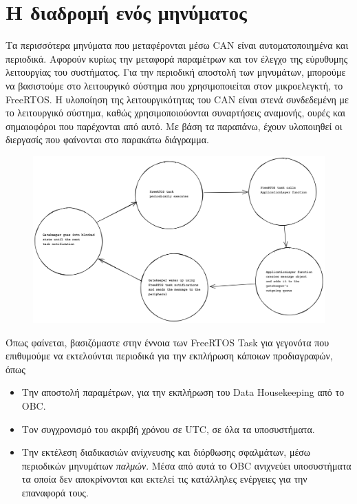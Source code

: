 \documentclass[a4paper,nobib,justified]{tufte-book}
\begin{document}

\section{Η διαδρομή ενός μηνύματος}

Τα περισσότερα μηνύματα που μεταφέρονται μέσω CAN είναι αυτοματοποιημένα και περιοδικά. Αφορούν κυρίως την μεταφορά παραμέτρων και τον έλεγχο της εύρυθυμης λειτουργίας του συστήματος. Για την περιοδική αποστολή των μηνυμάτων, μπορούμε να βασιστούμε στο λειτουργικό σύστημα που χρησιμοποιείται στον μικροελεγκτή, το FreeRTOS. Η υλοποίηση της λειτουργικότητας του CAN είναι στενά συνδεδεμένη με το λειτουργικό σύστημα, καθώς χρησιμοποιούονται συναρτήσεις αναμονής, ουρές και σημαιοφόροι που παρέχονται από αυτό. Με βάση τα παραπάνω, έχουν υλοποιηθεί οι διεργασίς που φαίνονται στο παρακάτω διάγραμμα.

\begin{figure}[ht]
	\includegraphics[width=0.8\pdfpagewidth]{media/diagrams/message-send-fsm.png}
\end{figure}

Όπως φαίνεται, βασιζόμαστε στην έννοια των FreeRTOS Task για γεγονότα που επιθυμούμε να εκτελούνται περιοδικά για την εκπλήρωση κάποιων προδιαγραφών, όπως
\begin{itemize}
	\item Την αποστολή παραμέτρων, για την εκπλήρωση του Data Housekeeping από το OBC.
	\item Τον συγχρονισμό του ακριβή χρόνου σε UTC, σε όλα τα υποσυστήματα.
	\item Την εκτέλεση διαδικασιών ανίχνευσης και διόρθωσης σφαλμάτων, μέσω περιοδικών μηνυμάτων \emph{παλμών}. Μέσα από αυτά το OBC ανιχνεύει υποσυστήματα τα οποία δεν αποκρίνονται και εκτελεί τις κατάλληλες ενέργειες για την επαναφορά τους. 
\end{itemize}
\end{document}
